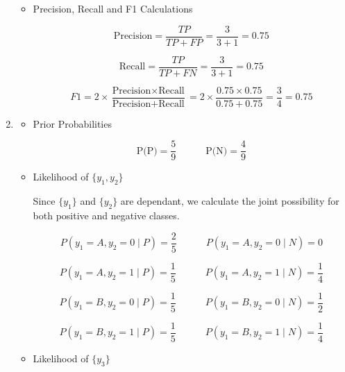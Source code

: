 \documentclass[12pt]{article}
\begin{document}
\begin{enumerate}[leftmargin=\labelsep, label=\textbf{\arabic*.)}]
\begin{itemize}
                    \vspace{0.5em}

              \item Precision, Recall and F1 Calculations

                    \[
                        \text{Precision} = \frac{TP}{TP + FP} = \frac{3}{3 + 1} = 0.75
                    \]

                    \[
                        \text{Recall} = \frac{TP}{TP + FN} = \frac{3}{3 + 1} = 0.75
                    \]

                    \[
                        F1 = 2 \times \frac{\text{Precision} \times \text{Recall}}{\text{Precision} + \text{Recall}} = 2 \times \frac{0.75 \times 0.75}{0.75 + 0.75} = \frac{3}{4} = 0.75
                    \]

          \end{itemize}
          
    \item \begin{itemize}
              \item Prior Probabilities

                    \[
                        \text{P(P)} = \frac{5}{9} \quad \quad \quad \text{P(N)} = \frac{4}{9}
                    \]

              \item Likelihood of $\{y_1, y_2\}$

                    Since $\{y_1\}$ and $\{y_2\}$ are dependant, we calculate the joint possibility for both positive and negative classes.

                    \[
                        P(y_1 = A, y_2 = 0 \mid P) = \frac{2}{5} \quad \quad \quad P(y_1 = A, y_2 = 0 \mid N) = 0
                    \]

                    \[
                        P(y_1 = A, y_2 = 1 \mid P) = \frac{1}{5} \quad \quad \quad P(y_1 = A, y_2 = 1 \mid N) = \frac{1}{4}
                    \]

                    \[
                        P(y_1 = B, y_2 = 0 \mid P) = \frac{1}{5} \quad \quad \quad P(y_1 = B, y_2 = 0 \mid N) = \frac{1}{2}
                    \]

                    \[
                        P(y_1 = B, y_2 = 1 \mid P) = \frac{1}{5} \quad \quad \quad P(y_1 = B, y_2 = 1 \mid N) = \frac{1}{4}
                    \]

              \item Likelihood of $\{y_3\}$


\end{itemize}
\end{enumerate}
\end{document}
